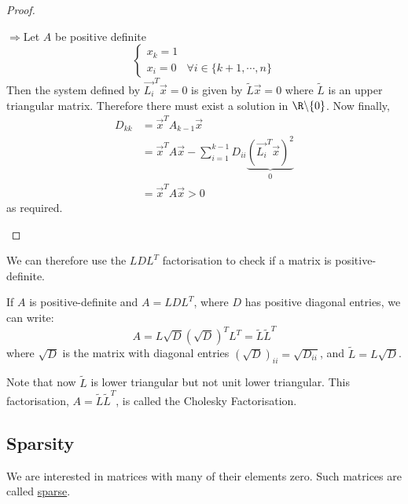 \documentclass[../Main.tex]{subfiles}
\begin{document}
\begin{proof}
\begin{proofdirection}{$\Rightarrow$}{Let $A$ be positive definite}
\begin{equation*}
\begin{cases}
                x_k = 1 &  \\
                x_i = 0 & \forall i \in \{k+1, \cdots, n\}
            \end{cases}
        \end{equation*}
        Then the system defined by $\vec{L_i}^T \vec{x} = 0$ is given by $\tilde{L} \vec{x} = 0$ where $\tilde{L}$ is an upper triangular matrix. Therefore there must exist a solution in $\R \backslash \{0\}$. Now finally,
        \begin{align*}
            D_{kk} &= \vec{x}^T A_{k-1} \vec{x} \\
            &= \vec{x}^T A \vec{x} - \sum_{i=1}^{k-1} D_{ii} \underbrace{\left(\vec{L_i}^T \vec{x}\right)^2}_{0} \\
            &= \vec{x}^T A \vec{x} > 0
        \end{align*}
        as required.
    \end{proofdirection}
\end{proof}
\begin{remark}
    We can therefore use the $LDL^T$ factorisation to check if a matrix is positive-definite.
\end{remark}
\begin{example}
    If $A$ is positive-definite and $A = LDL^T$, where $D$ has positive diagonal entries, we can write:
    \begin{equation*}
        A = L\sqrt{D} \left(\sqrt{D}\right)^T L^T = \tilde{L} \tilde{L}^T
    \end{equation*}
    where $\sqrt{D}$ is the matrix with diagonal entries $(\sqrt{D})_{ii} = \sqrt{D_{ii}}$, and $\tilde{L} = L\sqrt{D}$.

    Note that now $\tilde{L}$ is lower triangular but not unit lower triangular. This factorisation, $A = \tilde{L} \tilde{L}^T$, is called the Cholesky Factorisation.
\end{example}
\subsection{Sparsity}
We are interested in matrices with many of their elements zero. Such matrices are called \underline{sparse}.
\end{document}
